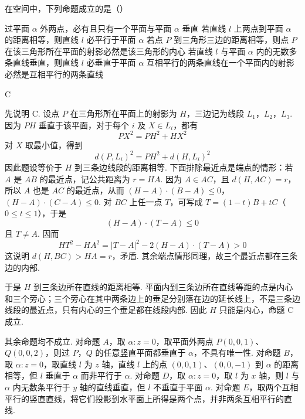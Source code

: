 \begin{problem}

在空间中，下列命题成立的是（\quad）

\choicesfive
    {过平面 \(\alpha\) 外两点，必有且只有一个平面与平面 \(\alpha\) 垂直}
    {若直线 \(l\) 上两点到平面 \(\alpha \) 的距离相等，则直线 \(l\) 必平行于平面 \(\alpha \)}
    {若点 \(P\) 到三角形三边的距离相等，则点 \(P\) 在该三角形所在平面的射影必然是该三角形的内心}
    {若直线 \(l\) 与平面 \(\alpha \) 内的无数多条直线垂直，则直线 \(l\) 必垂直于平面 \(\alpha \)}
    {互相平行的两条直线在一个平面内的射影必然是互相平行的两条直线}
\end{problem}

\begin{answer}
C
\end{answer}

\begin{solution}
先说明 C. 设点 \(P\) 在三角形所在平面上的射影为 \(H\)，三边记为线段 \(L_1\)，\(L_2\)，\(L_3\). 因为 \(PH\) 垂直于该平面，对于每个 \(i\) 及 \(X\in L_i\)，都有
\[
PX^2=PH^2+HX^2
\]
对 \(X\) 取最小值，得到
\[
d(P,L_i)^2=PH^2+d(H,L_i)^2
\]
因此题设等价于 \(H\) 到三条边线段的距离相等. 下面排除最近点是端点的情形：若 \(A\) 是 \(AB\) 的最近点，记公共距离为 \(r=HA\). 因为 \(A\in AC\)，且 \(d(H,AC)=r\)，所以 \(A\) 也是 \(AC\) 的最近点，从而
\((H-A)\cdot(B-A)\leq0\)，\((H-A)\cdot(C-A)\leq0\).
对 \(BC\) 上任一点 \(T\)，可写成 \(T=(1-t)B+tC\)（\(0\leq t\leq1\)），于是
\[
(H-A)\cdot(T-A)\leq0
\]
且 \(T\ne A\). 因而
\[
HT^2-HA^2=|T-A|^2-2(H-A)\cdot(T-A)>0
\]
这说明 \(d(H,BC)>HA=r\)，矛盾. 其余端点情形同理，故三个最近点都在三条边的内部.

于是 \(H\) 到三条边所在直线的距离相等. 平面内到三条边所在直线等距的点是内心和三个旁心；三个旁心在其中两条边上的垂足分别落在边的延长线上，不是三条边线段的最近点，只有内心的三个垂足都在线段内部. 因此 \(H\) 只能是内心，命题 C 成立.

其余命题均不成立. 对命题 \(A\)，取 \(\alpha:z=0\)，取平面外两点 \(P(0,0,1)\)、\(Q(0,0,2)\)，则过 \(P\)，\(Q\) 的任意竖直平面都垂直于 \(\alpha\)，不具有唯一性. 对命题 \(B\)，取 \(\alpha:z=0\)，取直线 \(l\) 为 \(z\) 轴，直线 \(l\) 上的点 \((0,0,1)\)、\((0,0,-1)\) 到 \(\alpha\) 的距离相等，但 \(l\) 垂直于 \(\alpha\) 而非平行于 \(\alpha\). 对命题 \(D\)，取 \(\alpha:z=0\)，取 \(l\) 为 \(x\) 轴，则 \(l\) 与 \(\alpha\) 内无数条平行于 \(y\) 轴的直线垂直，但 \(l\) 不垂直于平面 \(\alpha\). 对命题 \(E\)，取两个互相平行的竖直直线，将它们投影到水平面上所得是两个点，并非两条互相平行的直线.
\end{solution}



